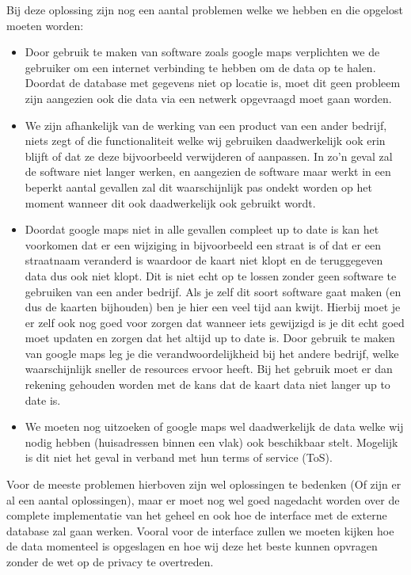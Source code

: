 Bij deze oplossing zijn nog een aantal problemen welke we hebben en die opgelost moeten worden:
\begin{itemize}
        \item Door gebruik te maken van software zoals google maps verplichten we de gebruiker om een internet verbinding te hebben om de data op te halen. Doordat de database met gegevens niet op locatie is, moet dit geen probleem zijn aangezien ook die data via een netwerk opgevraagd moet gaan worden.
        \item We zijn afhankelijk van de werking van een product van een ander bedrijf, niets zegt of die functionaliteit welke wij gebruiken daadwerkelijk ook erin blijft of dat ze deze bijvoorbeeld verwijderen of aanpassen. In zo'n geval zal de software niet langer werken, en aangezien de software maar werkt in een beperkt aantal gevallen zal dit waarschijnlijk pas ondekt worden op het moment wanneer dit ook daadwerkelijk ook gebruikt wordt. 
        \item Doordat google maps niet in alle gevallen compleet up to date is kan het voorkomen dat er een wijziging in bijvoorbeeld een straat is of dat er een straatnaam veranderd is waardoor de kaart niet klopt en de teruggegeven data dus ook niet klopt. Dit is niet echt op te lossen zonder geen software te gebruiken van een ander bedrijf. Als je zelf dit soort software gaat maken (en dus de kaarten bijhouden) ben je hier een veel tijd aan kwijt. Hierbij moet je er zelf ook nog goed voor zorgen dat wanneer iets gewijzigd is je dit echt goed moet updaten en zorgen dat het altijd up to date is. Door gebruik te maken van google maps leg je die verandwoordelijkheid bij het andere bedrijf, welke waarschijnlijk sneller de resources ervoor heeft. Bij het gebruik moet er dan rekening gehouden worden met de kans dat de kaart data niet langer up to date is. 
        \item We moeten nog uitzoeken of google maps wel daadwerkelijk de data welke wij nodig hebben (huisadressen binnen een vlak) ook beschikbaar stelt. Mogelijk is dit niet het geval in verband met hun terms of service (ToS).
\end{itemize}
Voor de meeste problemen hierboven zijn wel oplossingen te bedenken (Of zijn er al een aantal oplossingen), maar er moet nog wel goed nagedacht worden over de complete implementatie van het geheel en ook hoe de interface met de externe database zal gaan werken. Vooral voor de interface zullen we moeten kijken hoe de data momenteel is opgeslagen en hoe wij deze het beste kunnen opvragen zonder de wet op de privacy te overtreden.

